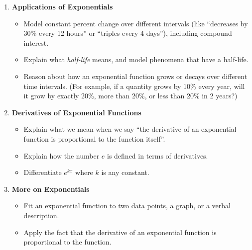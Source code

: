 \documentclass{article}
\begin{document}
\begin{enumerate}
\begin{itemize}
  \item Apply exponent rules. 
  \end{itemize}

\item \textbf{Applications of Exponentials} %
  \begin{itemize}
  \item Model constant percent change over different intervals (like ``decreases by 30\% every 12 hours'' or ``triples every 4 days''), including compound interest.

  \item Explain what \emph{half-life} means, and model phenomena that have a half-life. 

  \item Reason about how an exponential function grows or decays over different time intervals. (For example, if a quantity grows by 10\% every year, will it grow by exactly 20\%, more than 20\%, or less than 20\% in 2 years?)

  \end{itemize}

\item \textbf{Derivatives of Exponential Functions} %
  \begin{itemize}
  \item Explain what we mean when we say ``the derivative of an exponential function is proportional to the function itself''.

  \item Explain how the number $e$ is defined in terms of derivatives.

  \item Differentiate $e^{kx}$ where $k$ is any constant.

  \end{itemize}

\item \textbf{More on Exponentials} %
  \begin{itemize}
  \item Fit an exponential function to two data points, a graph, or a verbal description.

  \item Apply the fact that the derivative of an exponential function is proportional to the function.

  \end{itemize}



\end{enumerate}
\end{document}
